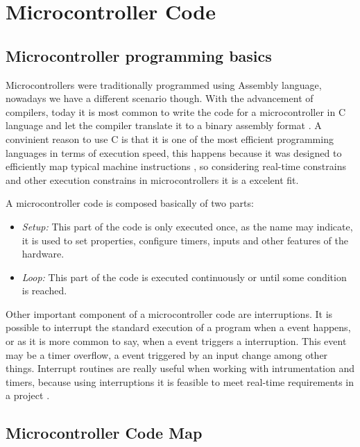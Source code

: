 \section{Microcontroller Code} \label{sec:microCode}

	\subsection{Microcontroller programming basics}
		Microcontrollers were traditionally programmed using Assembly language, nowadays we have a different scenario though. With the advancement of compilers, today it is most common to write the code for a microcontroller in C language and let the compiler translate it to a binary assembly format \cite{Mazidi:2010:AME:1824214}. A convinient reason to use C is that it is one of the most efficient programming languages in terms of execution speed, this happens because it was designed to efficiently map typical machine instructions \cite{kernighan2006c}, so considering real-time constrains and other execution constrains in microcontrollers it is a excelent fit.
		
		\par
		A microcontroller code is composed basically of two parts:
		
		\begin{itemize}
			\item \textit{Setup: } This part of the code is only executed once, as the name may indicate, it is used to set properties, configure timers, inputs and other features of the hardware.
			\item \textit{Loop: } This part of the code is executed continuously or until some condition is reached. 
		\end{itemize}
		
		\par
		
		Other important component of a microcontroller code are interruptions. It is possible to interrupt the standard execution of a program when a event happens, or as it is more common to say, when a event triggers a interruption. This event may be a timer overflow, a event triggered by an input change among other things. Interrupt routines are really useful when working with intrumentation and timers, because using interruptions it is feasible to meet real-time requirements in a project \cite{mukaro1999microcontroller}.
		
	\subsection{Microcontroller Code Map}
	
